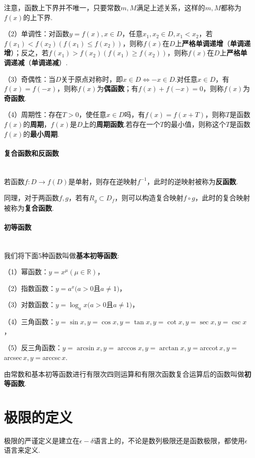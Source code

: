 \documentclass{ctexbook}
\begin{document}
	注意，函数上下界并不唯一，只要常数$m,M$满足上述关系，这样的$m,M$都称为$f(x)$的上下界.
	
	（2）单调性：对函数$y=f(x),x\in D$，任意$x_1,x_2\in D,x_1<x_2$，若$f(x_1)<f(x_2)(f(x_1)\le f(x_2))$，则称$f(x)$在$D$上\textbf{严格单调递增}（\textbf{单调递增}）；反之，若$f(x_1)>f(x_2)(f(x_1)\ge f(x_2))$，则称$f(x)$在$D$上\textbf{严格单调递减}（\textbf{单调递减}）.
	
	（3）奇偶性：当$D$关于原点对称时，即$x\in D \Leftrightarrow -x\in D$.对任意$x\in D$，有$f(x)=f(-x)$，则称$f(x)$为\textbf{偶函数}；有$f(x)+f(-x)=0$，则称$f(x)$为\textbf{奇函数}.
	
	（4）周期性：存在$T>0$，使任意$x\in D$吗，有$f(x)=f(x+T)$，则称$T$是函数$f(x)$的\textbf{周期}，$f(x)$是$D$上的\textbf{周期函数}.若存在一个$T$的最小值，则称这个$T$是函数$f(x)$的\textbf{最小周期}.
	
	\paragraph{复合函数和反函数}~{}
	\\
	\indent
	若函数$f:D\rightarrow f(D)$是单射，则存在逆映射$f^{-1}$，此时的逆映射被称为\textbf{反函数}.
	
	同理，对于两函数$f,g$，若有$R_g \subset D_f$，则可以构造复合映射$f\circ g$，此时的复合映射被称为\textbf{复合函数}.
	
	\paragraph{初等函数}~{}
	\\
	\indent
	我们将下面5种函数叫做\textbf{基本初等函数}:
	
	（1）幂函数：$y=x^\mu(\mu \in \mathbb{R})$，
	
	（2）指数函数：$y=a^x(a>0 $且$ a \neq 1) $，
	
	（3）对数函数：$y=\log_a x(a>0 $且$ a \neq 1)$，
	
	（4）三角函数：$y=\sin x,y=\cos x,y=\tan x,y=\cot x,y=\sec x,y=\csc x$，
	
	（5）反三角函数：$y=\arcsin x,y=\arccos x,y=\arctan x,y=$arccot$\, x,y=$arcsec$\, x,y=$arccsc$\, x$.
	
	由常数和基本初等函数进行有限次四则运算和有限次函数复合运算后的函数叫做\textbf{初等函数}.
	
	
	\section{极限的定义}
	极限的严谨定义是建立在$\epsilon-\delta$语言上的，不论是数列极限还是函数极限，都使用$\epsilon$语言来定义.
	
\end{document}
